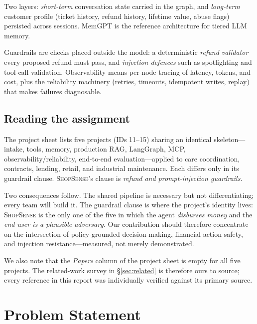 \documentclass[11pt,a4paper]{article}
\newcommand{\shopsense}{\textsc{ShopSense}}
\begin{document}
\begin{description}[style=nextline]
  \item[Customer memory.] Two layers: \emph{short-term} conversation state carried in the graph, and \emph{long-term} customer profile (ticket history, refund history, lifetime value, abuse flags) persisted across sessions. MemGPT \citep{packer2023memgpt} is the reference architecture for tiered LLM memory.
  \item[Guardrails; observability.] Guardrails are checks placed outside the model: a deterministic \emph{refund validator} every proposed refund must pass, and \emph{injection defences} such as spotlighting \citep{hines2024spotlighting} and tool-call validation. Observability means per-node tracing of latency, tokens, and cost, plus the reliability machinery (retries, timeouts, idempotent writes, replay) that makes failures diagnosable.
\end{description}

\subsection{Reading the assignment}

The project sheet lists five projects (IDs 11--15) sharing an identical skeleton---intake, tools, memory, production RAG, LangGraph, MCP, observability/reliability, end-to-end evaluation---applied to care coordination, contracts, lending, retail, and industrial maintenance. Each differs only in its guardrail clause. \shopsense{}'s clause is \emph{refund and prompt-injection guardrails}.

Two consequences follow. The shared pipeline is necessary but not differentiating; every team will build it. The guardrail clause is where the project's identity lives: \shopsense{} is the only one of the five in which the agent \emph{disburses money} and the \emph{end user is a plausible adversary}. Our contribution should therefore concentrate on the intersection of policy-grounded decision-making, financial action safety, and injection resistance---measured, not merely demonstrated.

We also note that the \emph{Papers} column of the project sheet is empty for all five projects. The related-work survey in \S\ref{sec:related} is therefore ours to source; every reference in this report was individually verified against its primary source.

\section{Problem Statement}\label{sec:problem}
\end{document}

